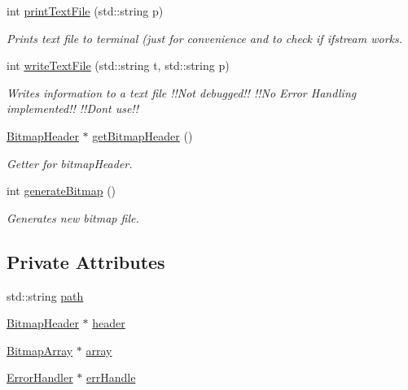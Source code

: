\begin{DoxyCompactItemize}
int \mbox{\hyperlink{classImage_ae5daf791502caefeae1b15360d354513}{print\+Text\+File}} (std\+::string p)
\begin{DoxyCompactList}\small\item\em Prints text file to terminal (just for convenience and to check if ifstream works. \end{DoxyCompactList}\item 
int \mbox{\hyperlink{classImage_a2dc30c9d6280b8c0edd2f4f0ab474a5c}{write\+Text\+File}} (std\+::string t, std\+::string p)
\begin{DoxyCompactList}\small\item\em Writes information to a text file !!\+Not debugged!! !!\+No Error Handling implemented!! !!\+Dont use!! \end{DoxyCompactList}\item 
\mbox{\hyperlink{classBitmapHeader}{Bitmap\+Header}} $\ast$ \mbox{\hyperlink{classImage_a8c824ffac0c866a94752a2c1047932af}{get\+Bitmap\+Header}} ()
\begin{DoxyCompactList}\small\item\em Getter for bitmap\+Header. \end{DoxyCompactList}\item 
int \mbox{\hyperlink{classImage_a3ca1ae6c1eb2846bfba066b01e6020e1}{generate\+Bitmap}} ()
\begin{DoxyCompactList}\small\item\em Generates new bitmap file. \end{DoxyCompactList}\end{DoxyCompactItemize}
\subsection*{Private Attributes}
\begin{DoxyCompactItemize}
\item 
std\+::string \mbox{\hyperlink{classImage_aec8a33f176362d146da8c058798ebbff}{path}}
\item 
\mbox{\hyperlink{classBitmapHeader}{Bitmap\+Header}} $\ast$ \mbox{\hyperlink{classImage_adaf72c2df8979eafb4031dc0384dc49f}{header}}
\item 
\mbox{\hyperlink{classBitmapArray}{Bitmap\+Array}} $\ast$ \mbox{\hyperlink{classImage_a1c18dd7d9eda416d44e7eb408d5b3c38}{array}}
\item 
\mbox{\hyperlink{classErrorHandler}{Error\+Handler}} $\ast$ \mbox{\hyperlink{classImage_a560753c20e67a544be57bba971021375}{err\+Handle}}
\end{DoxyCompactItemize}


